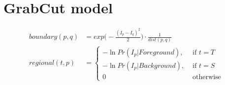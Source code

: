 \chapter{GrabCut model}
\label{chapter:appendix-grabcut-model}

\begin{align*}
	boundary(p,q) &= {exp\Big( -\frac{(I_p-I_q)^2}{2}} \Big) \cdot \frac{1}{dist(p,q)} \\
	regional(t,p) &= \left\{ \begin{array}{cc}
		-\ln Pr(I_p|Foreground), & \text{ if } t=T \\
		-\ln Pr(I_p|Background), & \text{ if } t=S \\		
		0 & \text{ otherwise }		
	\end{array}\right.
\end{align*}